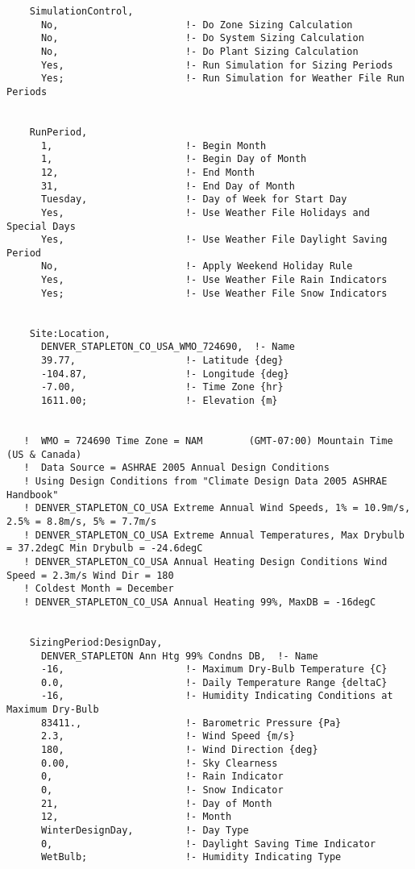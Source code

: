 \begin{lstlisting}
    SimulationControl,
      No,                      !- Do Zone Sizing Calculation
      No,                      !- Do System Sizing Calculation
      No,                      !- Do Plant Sizing Calculation
      Yes,                     !- Run Simulation for Sizing Periods
      Yes;                     !- Run Simulation for Weather File Run Periods


    RunPeriod,
      1,                       !- Begin Month
      1,                       !- Begin Day of Month
      12,                      !- End Month
      31,                      !- End Day of Month
      Tuesday,                 !- Day of Week for Start Day
      Yes,                     !- Use Weather File Holidays and Special Days
      Yes,                     !- Use Weather File Daylight Saving Period
      No,                      !- Apply Weekend Holiday Rule
      Yes,                     !- Use Weather File Rain Indicators
      Yes;                     !- Use Weather File Snow Indicators


    Site:Location,
      DENVER_STAPLETON_CO_USA_WMO_724690,  !- Name
      39.77,                   !- Latitude {deg}
      -104.87,                 !- Longitude {deg}
      -7.00,                   !- Time Zone {hr}
      1611.00;                 !- Elevation {m}


   !  WMO = 724690 Time Zone = NAM        (GMT-07:00) Mountain Time (US & Canada)
   !  Data Source = ASHRAE 2005 Annual Design Conditions
   ! Using Design Conditions from "Climate Design Data 2005 ASHRAE Handbook"
   ! DENVER_STAPLETON_CO_USA Extreme Annual Wind Speeds, 1% = 10.9m/s, 2.5% = 8.8m/s, 5% = 7.7m/s
   ! DENVER_STAPLETON_CO_USA Extreme Annual Temperatures, Max Drybulb = 37.2degC Min Drybulb = -24.6degC
   ! DENVER_STAPLETON_CO_USA Annual Heating Design Conditions Wind Speed = 2.3m/s Wind Dir = 180
   ! Coldest Month = December
   ! DENVER_STAPLETON_CO_USA Annual Heating 99%, MaxDB = -16degC


    SizingPeriod:DesignDay,
      DENVER_STAPLETON Ann Htg 99% Condns DB,  !- Name
      -16,                     !- Maximum Dry-Bulb Temperature {C}
      0.0,                     !- Daily Temperature Range {deltaC}
      -16,                     !- Humidity Indicating Conditions at Maximum Dry-Bulb
      83411.,                  !- Barometric Pressure {Pa}
      2.3,                     !- Wind Speed {m/s}
      180,                     !- Wind Direction {deg}
      0.00,                    !- Sky Clearness
      0,                       !- Rain Indicator
      0,                       !- Snow Indicator
      21,                      !- Day of Month
      12,                      !- Month
      WinterDesignDay,         !- Day Type
      0,                       !- Daylight Saving Time Indicator
      WetBulb;                 !- Humidity Indicating Type



\end{lstlisting}
